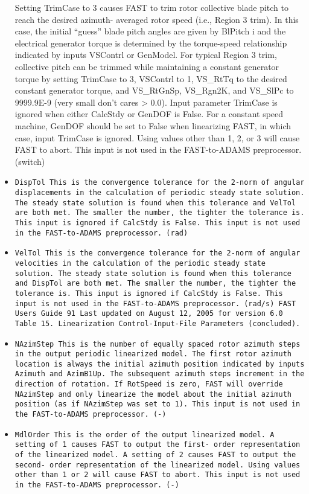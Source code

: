 \begin{itemize}
Setting TrimCase to 3 causes FAST to trim rotor collective blade pitch to reach the desired azimuth-
averaged rotor speed (i.e., Region 3 trim). In this case, the initial “guess” blade pitch angles are
given by BlPitch i and the electrical generator torque is determined by the torque-speed
relationship indicated by inputs VSContrl or GenModel. For typical Region 3 trim, collective
pitch can be trimmed while maintaining a constant generator torque by setting TrimCase to 3,
VSContrl to 1, VS\_RtTq to the desired constant generator torque, and VS\_RtGnSp,
VS\_Rgn2K, and VS\_SlPc to 9999.9E-9 (very small don’t cares > 0.0). Input parameter
TrimCase is ignored when either CalcStdy or GenDOF is False. For a constant speed machine,
GenDOF should be set to False when linearizing FAST, in which case, input TrimCase is
ignored. Using values other than 1, 2, or 3 will cause FAST to abort. This input is not used in the
FAST-to-ADAMS preprocessor. (switch)


\item \tt{DispTol} This is the convergence tolerance for the 2-norm of angular displacements in the calculation of
periodic steady state solution. The steady state solution is found when this tolerance and VelTol
are both met. The smaller the number, the tighter the tolerance is. This input is ignored if
CalcStdy is False. This input is not used in the FAST-to-ADAMS preprocessor. (rad)

\item \tt{VelTol} This is the convergence tolerance for the 2-norm of angular velocities in the calculation of the
periodic steady state solution. The steady state solution is found when this tolerance and DispTol
are both met. The smaller the number, the tighter the tolerance is. This input is ignored if
CalcStdy is False. This input is not used in the FAST-to-ADAMS preprocessor. (rad/s)
FAST Users Guide 91 Last updated on August 12, 2005 for version 6.0
Table 15. Linearization Control-Input-File Parameters (concluded).



\item \tt{NAzimStep} This is the number of equally spaced rotor azimuth steps in the output periodic linearized model.
The first rotor azimuth location is always the initial azimuth position indicated by inputs Azimuth
and AzimB1Up. The subsequent azimuth steps increment in the direction of rotation. If
RotSpeed is zero, FAST will override NAzimStep and only linearize the model about the initial
azimuth position (as if NAzimStep was set to 1). This input is not used in the FAST-to-ADAMS
preprocessor. (-)

\item \tt{MdlOrder} This is the order of the output linearized model. A setting of 1 causes FAST to output the first-
order representation of the linearized model. A setting of 2 causes FAST to output the second-
order representation of the linearized model. Using values other than 1 or 2 will cause FAST to
abort. This input is not used in the FAST-to-ADAMS preprocessor. (-)
\end{itemize}

